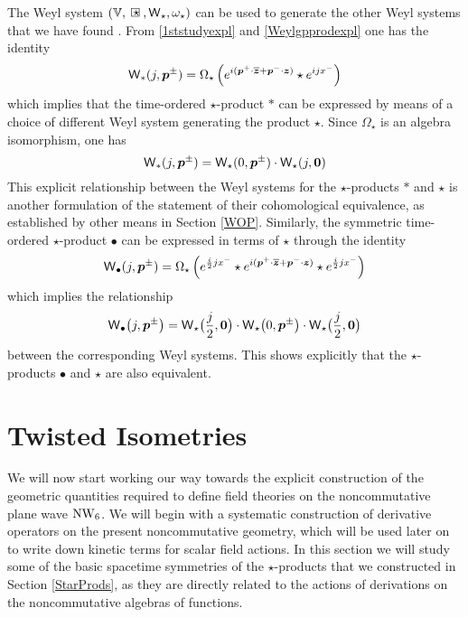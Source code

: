 The Weyl system $(\mbbV,\compc,\weyl_\star,\omega_\star)$ can be used to
generate the other Weyl systems that we have found \cite{ALZ1}. From
\eqref{1ststudyexpl} and \eqref{Weylgpprodexpl} one has the identity
\begin{equation}
  \label{weylTOWeylDelta}
  \operatorname{{\sf W}}_*(j,{{\boldsymbol {p} }}^\pm)=\Omega_\star\left(
    e^{ i({\boldsymbol {p} }^+\cdot\overline{{{\boldsymbol {z} }}}
      +{{\boldsymbol {p} }}^-\cdot{{\boldsymbol {z} }})}\star e^{ i j  x^-}\right)
\end{equation}
which implies that the time-ordered $\star$-product $*$ can be expressed by
means of a choice of different Weyl system generating the product $\star$. Since
$\Omega_\star$ is an algebra isomorphism, one has
\begin{equation}
  \label{weylTOWeylprods}
  \operatorname{{\sf W}}_*(j,{{\boldsymbol {p} }}^\pm)=\operatorname{{\sf W}}_\star(0,{{\boldsymbol {p} }}^\pm)
  \cdot\operatorname{{\sf W}}_\star(j,{\boldsymbol {0} })
\end{equation}
This explicit relationship between the Weyl systems for the $\star$-products $*$
and $\star$ is another formulation of the statement of their cohomological
equivalence, as established by other means in Section \ref{WOP}. Similarly, the
symmetric time-ordered $\star$-product $\bullet$ can be expressed in terms of
$\star$ through the identity
\begin{equation}
  \label{WeylTOsymWeylDelta}
  \operatorname{{\sf W}}_\bullet(j,{{\boldsymbol {p} }}^\pm)=\Omega_\star\left(
    e^{\frac i2 j x^-}\star e^{ i({{\boldsymbol {p} }}^+\cdot\overline{{{\boldsymbol {z} }}}
      +{{\boldsymbol {p} }}^-\cdot{{\boldsymbol {z} }})}\star e^{\frac i2 j x^-}\right)
\end{equation}
which implies the relationship
\begin{equation}
  \label{WeylTOsymWeylprods}
  \operatorname{{\sf W}}_\bullet\bigl(j,{{\boldsymbol {p} }}^\pm\bigr)=\operatorname{{\sf W}}_\star
  \bigl( \frac j2 ,{\boldsymbol {0} }\bigr)\cdot\operatorname{{\sf W}}_\star\bigl(0,{{\boldsymbol {p} }}^\pm\bigr)
  \cdot\operatorname{{\sf W}}_\star\bigl( \frac j2 ,{\boldsymbol {0} }\bigr)
\end{equation}
between the corresponding Weyl systems. This shows explicitly that the
$\star$-products $\bullet$ and $\star$ are also equivalent.

\section{Twisted Isometries}
\label{Coprod}
We will now start working our way towards the explicit construction of the
geometric quantities required to define field theories on the noncommutative
plane wave $\operatorname{NW}_6$. We will begin with a systematic construction of derivative
operators on the present noncommutative geometry, which will be used later on to
write down kinetic terms for scalar field actions. In this section we will study
some of the basic spacetime symmetries of the $\star$-products that we
constructed in Section \ref{StarProds}, as they are directly related to the
actions of derivations on the noncommutative algebras of functions.

